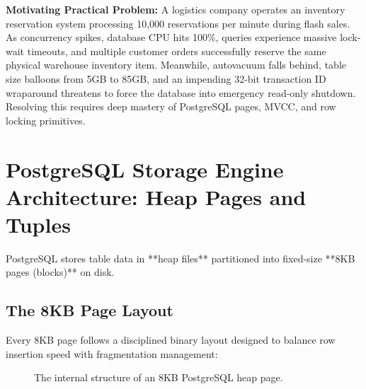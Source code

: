 \begin{chaptergoalsbox}
\textbf{Motivating Practical Problem:}
A logistics company operates an inventory reservation system processing 10,000 reservations per minute during flash sales. As concurrency spikes, database CPU hits 100\%, queries experience massive lock-wait timeouts, and multiple customer orders successfully reserve the same physical warehouse inventory item. Meanwhile, autovacuum falls behind, table size balloons from 5GB to 85GB, and an impending 32-bit transaction ID wraparound threatens to force the database into emergency read-only shutdown. Resolving this requires deep mastery of PostgreSQL pages, MVCC, and row locking primitives.
\end{chaptergoalsbox}

\section{PostgreSQL Storage Engine Architecture: Heap Pages and Tuples}

PostgreSQL stores table data in **heap files** partitioned into fixed-size **8KB pages (blocks)** on disk.

\subsection{The 8KB Page Layout}

Every 8KB page follows a disciplined binary layout designed to balance row insertion speed with fragmentation management:

\begin{figure}[htbp]
\centering
{}
\caption{The internal structure of an 8KB PostgreSQL heap page.}
\label{fig:postgres-page}
\end{figure}

